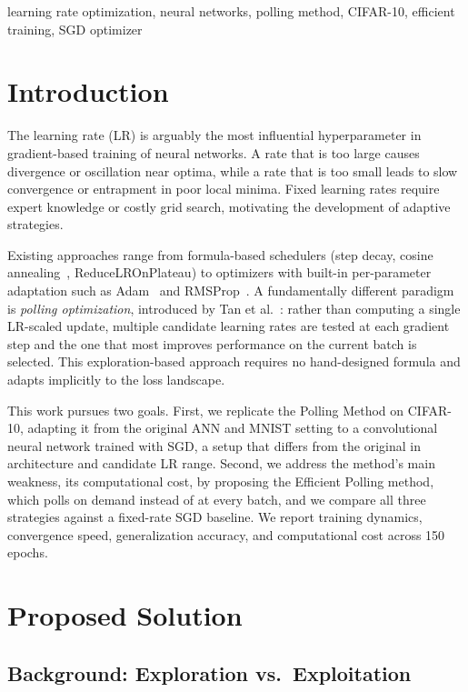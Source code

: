 \documentclass[conference]{IEEEtran}
\begin{document}
\begin{IEEEkeywords}
learning rate optimization, neural networks, polling method, CIFAR-10, efficient training, SGD optimizer
\end{IEEEkeywords}

\section{Introduction}

The learning rate (LR) is arguably the most influential hyperparameter in gradient-based training of neural networks. A rate that is too large causes divergence or oscillation near optima, while a rate that is too small leads to slow convergence or entrapment in poor local minima. Fixed learning rates require expert knowledge or costly grid search, motivating the development of adaptive strategies.

Existing approaches range from formula-based schedulers (step decay, cosine annealing~\cite{loshchilov2017sgdr}, ReduceLROnPlateau) to optimizers with built-in per-parameter adaptation such as Adam~\cite{kingma2015adam} and RMSProp~\cite{tieleman2012rmsprop}. A fundamentally different paradigm is \emph{polling optimization}, introduced by Tan et al.~\cite{tan2025polling}: rather than computing a single LR-scaled update, multiple candidate learning rates are tested at each gradient step and the one that most improves performance on the current batch is selected. This exploration-based approach requires no hand-designed formula and adapts implicitly to the loss landscape.

This work pursues two goals. First, we replicate the Polling Method on CIFAR-10, adapting it from the original ANN and MNIST setting to a convolutional neural network trained with SGD, a setup that differs from the original in architecture and candidate LR range. Second, we address the method's main weakness, its computational cost, by proposing the Efficient Polling method, which polls on demand instead of at every batch, and we compare all three strategies against a fixed-rate SGD baseline. We report training dynamics, convergence speed, generalization accuracy, and computational cost across 150 epochs.

\section{Proposed Solution}

\subsection{Background: Exploration vs.\ Exploitation}
\end{document}
